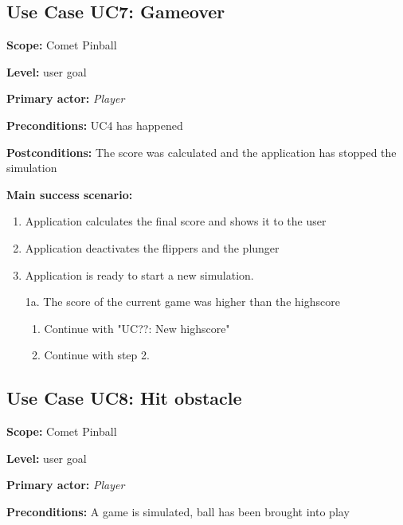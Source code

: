 \documentclass[fontsize=12pt,
               paper=a4,
               twoside=false,
               parskip=half,
               ]{scrartcl}
\begin{document}

\subsection{Use Case UC7: Gameover}

\textbf{\textsf{Scope:}} Comet Pinball

\textbf{\textsf{Level:}} user goal

\textbf{\textsf{Primary actor:}} \emph{Player}

\textbf{\textsf{Preconditions:}} UC4 has happened

\textbf{\textsf{Postconditions:}} The score was calculated and the application has stopped the simulation

\textbf{\textsf{Main success scenario:}}

\begin{enumerate}[leftmargin=3em]
	\item Application calculates the final score and shows it to the user
	\item Application deactivates the flippers and the plunger
	\item Application is ready to start a new simulation.
\end{enumerate}


\begin{itemize}[leftmargin=3em]
	\item[1a.]  The score of the current game was higher than the highscore
	\begin{enumerate}
		\item Continue with "UC??: New highscore"
		\item Continue with step 2.
	\end{enumerate}
\end{itemize}




\subsection{Use Case UC8: Hit obstacle}

\textbf{\textsf{Scope:}} Comet Pinball

\textbf{\textsf{Level:}} user goal

\textbf{\textsf{Primary actor:}} \emph{Player}

\textbf{\textsf{Preconditions:}} A game is simulated, ball has been brought into play
\end{document}
